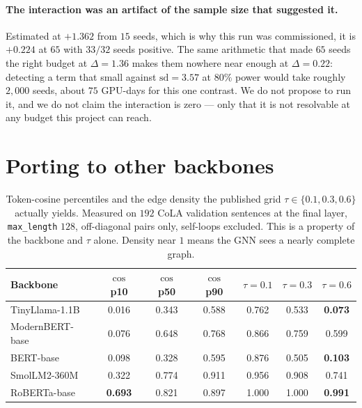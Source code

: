 \documentclass{article}
\begin{document}
\paragraph{The interaction was an artifact of the sample size that suggested
it.} Estimated at $+1.362$ from $15$ seeds, which is why this run was
commissioned, it is $+0.224$ at $65$ with $33/32$ seeds positive. The same
arithmetic that made $65$ seeds the right budget at $\Delta=1.36$ makes them
nowhere near enough at $\Delta=0.22$: detecting a term that small against
$\mathrm{sd}=3.57$ at $80\%$ power would take roughly $2{,}000$ seeds, about
$75$ GPU-days for this one contrast. We do not propose to run it, and we do not
claim the interaction is zero --- only that it is not resolvable at any budget
this project can reach.

\section{Porting to other backbones}
\label{app:calib}

\begin{table}[h]
\caption{Token-cosine percentiles and the edge density the published grid
$\tau \in \{0.1,0.3,0.6\}$ actually yields. Measured on $192$ CoLA validation
sentences at the final layer, \texttt{max\_length} $128$, off-diagonal pairs
only, self-loops excluded. This is a property of the backbone and $\tau$ alone.
Density near $1$ means the GNN sees a nearly complete graph.}
\label{tab:density}
\begin{center}
\small
\begin{tabular}{lcccccc}
\toprule
Backbone & $\cos$ p10 & $\cos$ p50 & $\cos$ p90 & $\tau{=}0.1$ & $\tau{=}0.3$ & $\tau{=}0.6$ \\
\midrule
TinyLlama-1.1B   & 0.016 & 0.343 & 0.588 & 0.762 & 0.533 & \textbf{0.073} \\
ModernBERT-base  & 0.076 & 0.648 & 0.768 & 0.866 & 0.759 & 0.599 \\
BERT-base        & 0.098 & 0.328 & 0.595 & 0.876 & 0.505 & \textbf{0.103} \\
SmolLM2-360M     & 0.322 & 0.774 & 0.911 & 0.956 & 0.908 & 0.741 \\
RoBERTa-base     & \textbf{0.693} & 0.821 & 0.897 & 1.000 & 1.000 & \textbf{0.991} \\
\bottomrule
\end{tabular}
\end{center}
\end{table}
\end{document}
